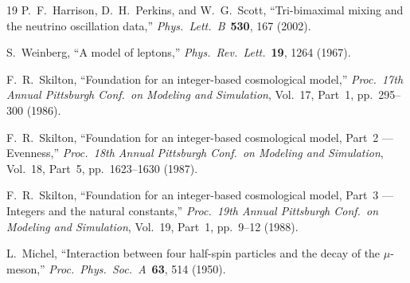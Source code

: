 \documentclass[11pt,a4paper]{article}
\begin{document}
\begin{thebibliography}{19}
P.~F.~Harrison, D.~H.~Perkins, and W.~G.~Scott,
``Tri-bimaximal mixing and the neutrino oscillation data,''
\emph{Phys.\ Lett.\ B}\ \textbf{530}, 167 (2002).

S.~Weinberg,
``A model of leptons,''
\emph{Phys.\ Rev.\ Lett.}\ \textbf{19}, 1264 (1967).

F.~R.~Skilton,
``Foundation for an integer-based cosmological model,''
\emph{Proc.\ 17th Annual Pittsburgh Conf.\ on Modeling and Simulation}, Vol.~17, Part~1, pp.~295--300 (1986).

F.~R.~Skilton,
``Foundation for an integer-based cosmological model, Part~2 --- Evenness,''
\emph{Proc.\ 18th Annual Pittsburgh Conf.\ on Modeling and Simulation}, Vol.~18, Part~5, pp.~1623--1630 (1987).

F.~R.~Skilton,
``Foundation for an integer-based cosmological model, Part~3 --- Integers and the natural constants,''
\emph{Proc.\ 19th Annual Pittsburgh Conf.\ on Modeling and Simulation}, Vol.~19, Part~1, pp.~9--12 (1988).

L.~Michel,
``Interaction between four half-spin particles and the decay of the $\mu$-meson,''
\emph{Proc.\ Phys.\ Soc.\ A}\ \textbf{63}, 514 (1950).

\end{thebibliography}
\end{document}
